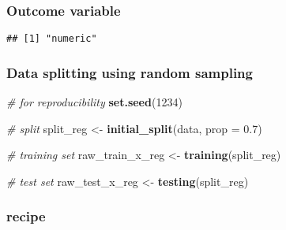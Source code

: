\documentclass[
]{book}
\newenvironment{Shaded}{\begin{snugshade}}{\end{snugshade}}
\newcommand{\CommentTok}[1]{\textcolor[rgb]{0.56,0.35,0.01}{\textit{#1}}}
\newcommand{\DataTypeTok}[1]{\textcolor[rgb]{0.13,0.29,0.53}{#1}}
\newcommand{\DecValTok}[1]{\textcolor[rgb]{0.00,0.00,0.81}{#1}}
\newcommand{\FloatTok}[1]{\textcolor[rgb]{0.00,0.00,0.81}{#1}}
\newcommand{\KeywordTok}[1]{\textcolor[rgb]{0.13,0.29,0.53}{\textbf{#1}}}
\newcommand{\NormalTok}[1]{#1}
\newcommand{\OperatorTok}[1]{\textcolor[rgb]{0.81,0.36,0.00}{\textbf{#1}}}
\newcommand{\StringTok}[1]{\textcolor[rgb]{0.31,0.60,0.02}{#1}}
\begin{document}
\hypertarget{outcome-variable}{%
\subsubsection{Outcome variable}\label{outcome-variable}}

\begin{Shaded}
\end{Shaded}

\begin{verbatim}
## [1] "numeric"
\end{verbatim}

\hypertarget{data-splitting-using-random-sampling}{%
\subsubsection{Data splitting using random sampling}\label{data-splitting-using-random-sampling}}

\begin{Shaded}
\begin{Highlighting}[]
\CommentTok{\# for reproducibility }
\KeywordTok{set.seed}\NormalTok{(}\DecValTok{1234}\NormalTok{) }

\CommentTok{\# split }
\NormalTok{split\_reg \textless{}{-}}\StringTok{ }\KeywordTok{initial\_split}\NormalTok{(data, }\DataTypeTok{prop =} \FloatTok{0.7}\NormalTok{)}

\CommentTok{\# training set }
\NormalTok{raw\_train\_x\_reg \textless{}{-}}\StringTok{ }\KeywordTok{training}\NormalTok{(split\_reg)}

\CommentTok{\# test set }
\NormalTok{raw\_test\_x\_reg \textless{}{-}}\StringTok{ }\KeywordTok{testing}\NormalTok{(split\_reg)}
\end{Highlighting}
\end{Shaded}

\hypertarget{recipe}{%
\subsubsection{recipe}\label{recipe}}
\end{document}
